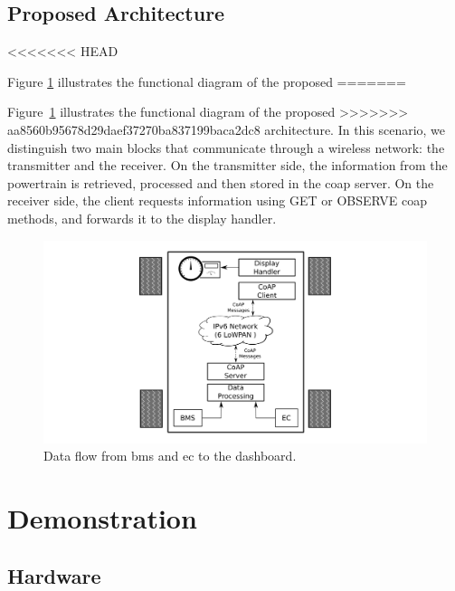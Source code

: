 \documentclass[runningheads]{llncs}
\begin{document}
\subsection{Proposed Architecture}
<<<<<<< HEAD
 
Figure \ref{car_network} illustrates the functional diagram of the proposed
=======

Figure~\ref{car_network} illustrates the functional diagram of the proposed
>>>>>>> aa8560b95678d29daef37270ba837199baca2dc8
architecture.
In this scenario, we distinguish two main blocks that communicate through a wireless network: the transmitter and the receiver.
On the transmitter side, the information from the powertrain is retrieved,
processed and then stored in the \gls{coap} server.
On the receiver side, the client requests information using GET or OBSERVE \gls{coap} methods, and forwards it to the display handler.

\begin{figure}[!h]
	\includegraphics[width=\textwidth] {Car_Network.pdf}
	\caption{Data flow from \gls{bms} and \gls{ec} to the dashboard.}
	\label{car_network}
\end{figure}


\section{Demonstration}
\label{sec:demo}

\subsection{Hardware}
\label{subsec:hardware}
\end{document}
